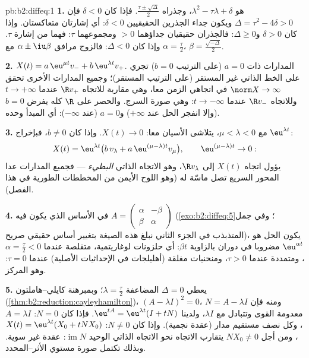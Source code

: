 \begin{solution}{pb:b2:diffeq:1}
\textbf{1.}  هو $\lambda^2 -
\tau\lambda + \delta$، وجذراه $\frac{\tau\pm\sqrt\Delta}{2}$. فإذا كان
$\delta < 0$ فإن $\Delta =
\tau^2 - 4\delta > 0$ ويكون جداء الجذرين الحقيقيين $\delta < 0$: أي إشارتان
متعاكستان. وإذا كان $\delta > 0$ و$\Delta \geq
0$: فالجذران حقيقيان جداؤهما $> 0$
ومجموعهما $\tau$: فهما من إشارة $\tau$. وإذا كان $\Delta < 0$: فالزوج
مرافق $\alpha \pm
\iu\beta$ مع $\alpha = \frac\tau2$، $\beta =
\frac{\sqrt{-\Delta}}2$.

\textbf{2.} $X(t) = a\,\eu^{\mu t}v_- + b\,\eu^{\lambda t}v_+$.
المدارات ذات $a = 0$ (على الترتيب $b = 0$) تجري على الخط الذاتي غير
المستقر (على الترتيب المستقر)؛ وجميع المدارات الأخرى تحقق $\norm X \to \infty$ في
اتجاهي الزمن معا، وهي مقاربة للاتجاه $\R v_+$ عندما $t \to
+\infty$ وللاتجاه
$\R v_-$ عندما $t \to -\infty$: وهي صورة السرج. والحصر على $\R$ كله يفرض
$b = 0$ (وإلا انفجر الحل عند $+\infty$) و$a = 0$ (عند $-\infty$): أي المبدأ
وحده.

\textbf{3.} مع $\mu < \lambda < 0$، يتلاشى الأسيان معا: $X(t) \to 0$. وإذا كان $b \neq 0$،
فبإخراج $\eu^{\lambda t}$:
\[
X(t) = \eu^{\lambda t}\bigl(b\,v_\lambda + a\,\eu^{(\mu -
\lambda)t}v_\mu\bigr),
\qquad \eu^{(\mu-\lambda)t} \to 0 :
\]
يؤول اتجاه $X(t)$ إلى $\R v_\lambda$، وهو الاتجاه الذاتي \emph{البطيء} ---
فجميع المدارات عدا المحور السريع تصل ماسّة له (وهو اللوح الأيمن من
المخططات الطورية في هذا الفصل).

\textbf{4.} في الأساس الذي يكون فيه $A = \begin{pmatrix} \alpha &
-\beta\\ \beta & \alpha\end{pmatrix}$ (\cref{exo:b2:diffeq:5}؛ وفي جمل
المتذبذب في الجزء الثاني نبلغ هذه الصيغة بتغيير أساس حقيقي صريح)،
يكون الحل هو $\eu^{\alpha t}$ مضروبا في دوران بالزاوية $\beta
t$: أي حلزونات
لوغاريتمية، متقلصة عندما $\alpha = \frac\tau2
< 0$، ومتمددة عندما $\tau > 0$، ومنحنيات
مغلقة (أهليلجات في الإحداثيات الأصلية) عندما $\tau = 0$: وهو المركز.

\textbf{5.} يعطي $\Delta = 0$  المضاعفة $\lambda =
\frac\tau2$؛ وبمبرهنة
كايلي--هاملتون (\cref{thm:b2:reduction:cayleyhamilton})، $(A - \lambda I)^2 =
0$، ومنه فإن $N = A - \lambda I$ معدومة القوى
وتتبادل مع $\lambda I$، ولدينا $\eu^{tA} = \eu^{\lambda t}(I + tN)$. فإذا كان $N =
0$: $A = \lambda I$، وكل نصف
مستقيم مدار (عقدة نجمية). وإذا كان $N
\neq 0$: $X(t) = \eu^{\lambda t}(X_0 + tNX_0)$، ومن أجل $NX_0
\neq 0$
يتقارب الاتجاه نحو الاتجاه الذاتي الوحيد $\operatorname{im}N$: عقدة غير سوية.
وبذلك تكتمل صورة مستوي الأثر--المحدد.


\end{solution}
